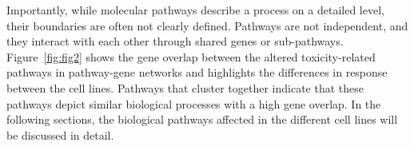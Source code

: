 \documentclass[ijms,article,submit,moreauthors,pdftex]{Definitions/mdpi}
\begin{document}
\begin{table}[]
\caption{Table depicting the number of significantly overrepresented pathways, altered toxicity pathways and the number of altered toxicity pathways for each GO-term.}
\end{table}


Importantly, while molecular pathways describe a process on a detailed level, their boundaries are often not clearly defined. Pathways are not independent, and they interact with each other through shared genes or sub-pathways. Figure~\ref{fig:fig2} shows the gene overlap between the altered toxicity-related pathways in pathway-gene networks and highlights the differences in response between the cell lines. Pathways that cluster together indicate that these pathways depict similar biological processes with a high gene overlap. In the following sections, the biological pathways affected in the different cell lines will be discussed in detail.
\end{document}
